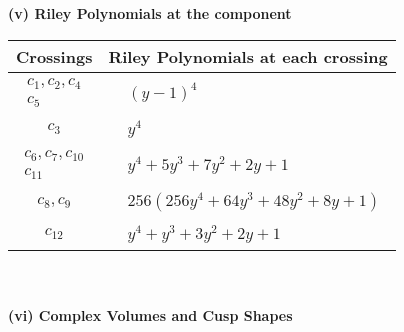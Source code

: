 \documentclass[1p]{elsarticle_modified}
\theoremstyle{definition}
\begin{document}
\newpage\renewcommand{\arraystretch}{1}
\flushleft \textbf{(v) Riley Polynomials at the component}\newline \\
\begin{tabular}{m{50pt}|m{274pt}}
Crossings & \hspace{64pt}Riley Polynomials at each crossing \\
\hline $$\begin{aligned}c_{1},c_{2},c_{4}\\c_{5}\end{aligned}$$&$\begin{aligned}
&(y-1)^4
\end{aligned}$\\
\hline $$\begin{aligned}c_{3}\end{aligned}$$&$\begin{aligned}
&y^4
\end{aligned}$\\
\hline $$\begin{aligned}c_{6},c_{7},c_{10}\\c_{11}\end{aligned}$$&$\begin{aligned}
&y^4+5 y^3+7 y^2+2 y+1
\end{aligned}$\\
\hline $$\begin{aligned}c_{8},c_{9}\end{aligned}$$&$\begin{aligned}
&256(256 y^4+64 y^3+48 y^2+8 y+1)
\end{aligned}$\\
\hline $$\begin{aligned}c_{12}\end{aligned}$$&$\begin{aligned}
&y^4+y^3+3 y^2+2 y+1
\end{aligned}$\\
\hline
\end{tabular}\\~\\
\newpage\flushleft \textbf{(vi) Complex Volumes and Cusp Shapes}
\end{document}
